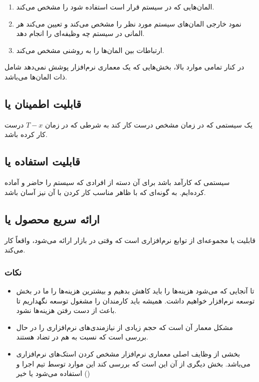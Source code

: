 \documentclass[a4paper]{article}
\begin{document}
\begin{enumerate}
    \item المان‌هایی که در سیستم قرار است استفاده شود را مشخص می‌کند.
    \item نمود خارجی المان‌های سیستم مورد نظر را مشخص می‌کند و تعیین می‌کند هر
    المانی در سیستم چه وظیفه‌ای را انجام دهد.
    \item ارتباطات بین المان‌ها را به روشنی مشخص می‌کند.
\end{enumerate}

در کنار تمامی موارد بالا، بخش‌هایی که یک معماری نرم‌افزار پوشش نمی‌دهد شامل ذات
المان‌ها می‌باشد.

\subsection{قابلیت اطمینان یا }

یک سیستمی که در زمان مشخص درست کار کند به شرطی که در زمان $T - x$ درست کار کرده
باشد.

\subsection{قابلیت استفاده یا }

سیستمی که کارآمد باشد برای آن دسته از افرادی که سیستم را حاضر و آماده کرده‌ایم.
به گونه‌ای که با ظاهر مناسب کار کردن با آن نیز آسان باشد.

\subsection{ارائه سریع محصول یا }

قابلیت یا  مجموعه‌ای از توابع نرم‌افزاری است که وقتی در بازار ارائه
می‌شود، واقعاً کار می‌کند. 

\subsubsection*{نکات}

\begin{itemize}
    \item تا آنجایی که می‌شود هزینه‌ها را باید کاهش بدهیم و بیشترین هزینه‌ها را
    ما در بخش توسعه نرم‌افزار خواهیم داشت. همیشه باید کارمندان را مشغول توسعه
    نگهداریم تا باعث از دست رفتن هزینه‌ها نشود.
    \item مشکل معمار آن است که حجم زیادی از نیازمندی‌های نرم‌افزاری را در حال
    بررسی است که نسبت به هم در تضاد هستند.
    \item بخشی از وظایف اصلی معماری نرم‌افزار مشخص کردن استک‌های نرم‌افزاری
    می‌باشد. بخش دیگری از آن این است که بررسی کند این موارد توسط تیم اجرا و
    استفاده می‌شود یا خیر ()
\end{itemize}
\end{document}
